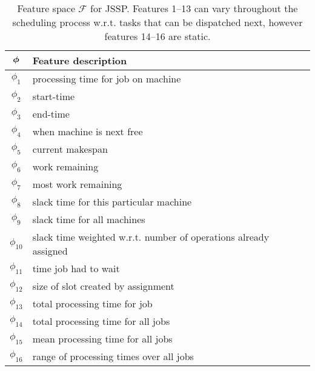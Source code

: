 \documentclass[10pt]{llncs} %
\renewcommand{\vec}[1]{{\mbox{\boldmath$#1$}}}
\begin{document}


\begin{table}[t!]
 {\tiny
 \begin{center}
  \begin{tabular}{|c|l|}
   \hline\hline
  $\vec{\phi}$ & Feature description \\ \hline
  $\phi_1$ & processing time for job on machine\\
  $\phi_2$ & start-time \\
  $\phi_3$ & end-time \\
  $\phi_4$ & when machine is next free \\
  $\phi_5$ & current makespan \\
  $\phi_6$ & work remaining \\
  $\phi_7$ & most work remaining \\
  $\phi_8$ & slack time for this particular machine \\
  $\phi_9$ & slack time for all machines \\
  $\phi_{10}$ & slack time weighted w.r.t. number of operations already assigned \\
  $\phi_{11}$ & time job had to wait\\
  $\phi_{12}$ & size of slot created by assignment \\
  $\phi_{13}$ & total processing time for job \\
  $\phi_{14}$ & total processing time for all jobs \\%
  $\phi_{15}$ & mean processing time for all jobs \\%
  $\phi_{16}$ & range of processing times over all jobs \\%
   \hline\hline
  \end{tabular}
 \end{center}}
 \caption{Feature space $\mathcal{F}$ for JSSP. Features 1--13 can vary throughout the scheduling process w.r.t. tasks that can be dispatched next, however features 14--16 are static.}
 \label{tbl:feat}
\end{table}
\end{document}
